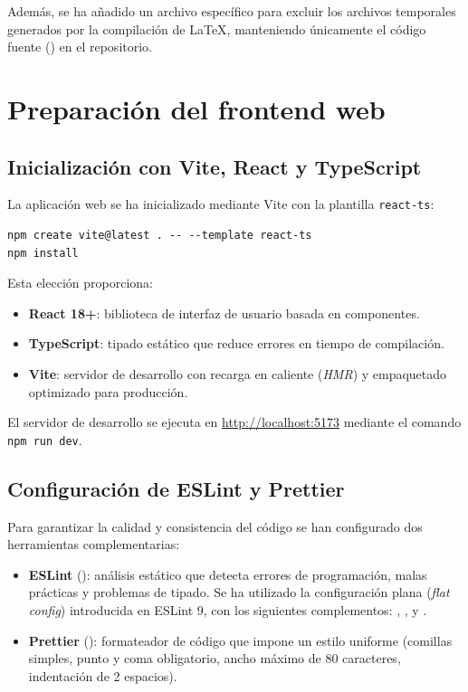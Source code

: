 \documentclass[12pt,a4paper]{report}
\begin{document}
Además, se ha añadido un archivo  específico para excluir los archivos temporales generados por la compilación de LaTeX, manteniendo únicamente el código fuente () en el repositorio.

\section{Preparación del frontend web}

\subsection{Inicialización con Vite, React y TypeScript}

La aplicación web se ha inicializado mediante Vite
con la plantilla \texttt{react-ts}: 

\begin{verbatim}
npm create vite@latest . -- --template react-ts
npm install
\end{verbatim}

Esta elección proporciona:

\begin{itemize}
    \item \textbf{React 18+}: biblioteca de interfaz de usuario basada en componentes.
    \item \textbf{TypeScript}: tipado estático que reduce errores en tiempo de compilación.
    \item \textbf{Vite}: servidor de desarrollo con recarga en caliente (\textit{HMR}) y empaquetado optimizado para producción.
\end{itemize}

El servidor de desarrollo se ejecuta en \url{http://localhost:5173} mediante el comando \texttt{npm run dev}.

\subsection{Configuración de ESLint y Prettier}

Para garantizar la calidad y consistencia del código se han configurado dos herramientas complementarias:

\begin{itemize}
    \item \textbf{ESLint} (): análisis estático que
    detecta errores de programación, malas prácticas y problemas de tipado.
    Se ha utilizado
    la configuración plana (\textit{flat config}) introducida en ESLint 9, con los
    siguientes complementos: , ,
     y .
    \item \textbf{Prettier} (): formateador de código que impone un estilo uniforme (comillas simples, punto y coma obligatorio, ancho máximo de 80 caracteres, indentación de 2 espacios).
\end{itemize}
\end{document}
